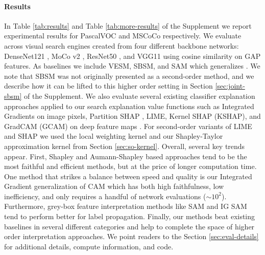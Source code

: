 \documentclass{article} %
\begin{document}
\paragraph{Results} In Table \ref{tab:results} and Table \ref{tab:more-results} of the Supplement we report experimental results for PascalVOC and MSCoCo respectively. We evaluate across visual search engines created from four different backbone networks: DenseNet121 \citep{huang2017densely}, MoCo v2 \citep{mocov2}, ResNet50 \citep{he2016deep}, and VGG11 \citep{simonyan2014very} using cosine similarity on GAP features. As baselines we include VESM, SBSM, and SAM which generalizes \citep{vedml}. We note that SBSM was not originally presented as a second-order method, and we describe how it can be lifted to this higher order setting in Section \ref{sec:joint-sbsm} of the Supplement. We also evaluate several existing classifier explanation approaches applied to our search explanation value functions such as Integrated Gradients \citep{integrated-gradients} on image pixels, Partition SHAP \citep{partition-shap}, LIME, Kernel SHAP (KSHAP), and GradCAM (GCAM) on deep feature maps \citep{gradcam}. For second-order variants of LIME and SHAP we used the local weighting kernel and our Shapley-Taylor approximation kernel from Section \ref{sec:so-kernel}. Overall, several key trends appear. First, Shapley and Aumann-Shapley based approaches tend to be the most faithful and efficient methods, but at the price of longer computation time. One method that strikes a balance between speed and quality is our Integrated Gradient generalization of CAM which has both high faithfulness, low inefficiency, and only requires a handful of network evaluations ($\sim10^2$). Furthermore, grey-box feature interpretation methods like SAM and IG SAM tend to perform better for label propagation. Finally, our methods beat existing baselines in several different categories and help to complete the space of higher order interpretation approaches. We point readers to the Section \ref{sec:eval-details} for additional details, compute information, and code. 
\vspace{-.1in}
\end{document}

